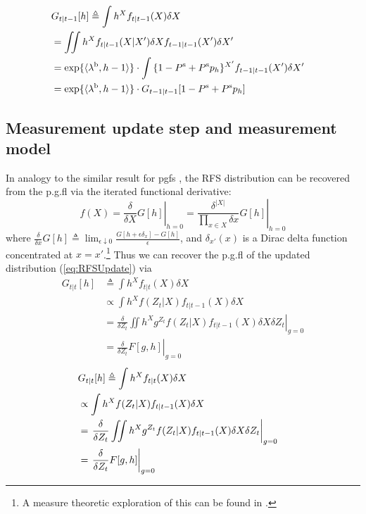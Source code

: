 \documentclass[journal,twoside]{IEEEtran}
\theoremstyle{plain}
\begin{document}
\else
\begin{align}
\lefteqn{G_{t|t-1}[h] \triangleq \int{h^X f_{t|t-1}(X) \delta X}} \\
&= \iint{h^X f_{t|t-1}(X|X')\delta X f_{t-1|t-1}(X') \delta X'} \\
&= \exp\{\langle\lambda^\mathrm{b},h-1\rangle\}\cdot \int{\{1-P^{\mathrm{s}} + P^{\mathrm{s}} p_h\}^{X'}f_{t-1|t-1}(X')\delta X'} \\
&= \exp\{\langle\lambda^\mathrm{b},h-1\rangle\} \cdot G_{t-1|t-1}[1-P^{\mathrm{s}} + P^{\mathrm{s}} p_h] \label{eq:PGFLPrediction}
\end{align}
\fi

\subsection{Measurement update step and measurement model}
\label{ss:RFSUpdate}
%
In analogy to the similar result for pgfs \cite[p150]{GriSti01}, the RFS distribution can be recovered from the p.g.fl via the iterated functional derivative: \cite[p375-376,384]{Mah07}
%
\begin{equation}\label{eq:PGFLInversion}
f(X) = \left.\frac{\delta}{\delta X}G[h]\right|_{h=0} = \left.\frac{\delta^{|X|}}{\prod_{x\in X}\delta x}G[h]\right|_{h=0}
\end{equation}
%
where $\frac{\delta}{\delta x}G[h] \triangleq \lim_{\epsilon\downarrow 0}\frac{G[h + \epsilon\delta_x] - G[h]}{\epsilon}$, and $\delta_{x'}(x)$ is a Dirac delta function concentrated at $x=x'$.\footnote{A measure theoretic exploration of this can be found in \cite[Section 2.2.5]{Vo08}.} Thus we can recover the p.g.fl of the updated distribution (\ref{eq:RFSUpdate}) via \cite[p530]{Mah07}
%
\ifCLASSOPTIONdraftcls
\begin{align}
G_{t|t}[h] &\triangleq \int{h^X f_{t|t}(X)\delta X} \\
&\propto \int{h^X f(Z_t|X)f_{t|t-1}(X)\delta X} \\
&= \left.\frac{\delta}{\delta Z_t}\iint{h^X g^{Z_t} f(Z_t|X)f_{t|t-1}(X)\delta X\delta Z_t}\right|_{g=0} \\
&= \left.\frac{\delta}{\delta Z_t}
F[g,h]
\right|_{g=0} \label{eq:PGFLUpdate}
\end{align}
\else
\begin{align}
\lefteqn{G_{t|t}[h] \triangleq \int{h^X f_{t|t}(X)\delta X}} \\
&\propto \int{h^X f(Z_t|X)f_{t|t-1}(X)\delta X} \\
&= \left.\frac{\delta}{\delta Z_t}\iint{h^X g^{Z_t} f(Z_t|X)f_{t|t-1}(X)\delta X\delta Z_t}\right|_{g=0} \\
&= \left.\frac{\delta}{\delta Z_t}
F[g,h]
\right|_{g=0} \label{eq:PGFLUpdate}
\end{align}
\end{document}
